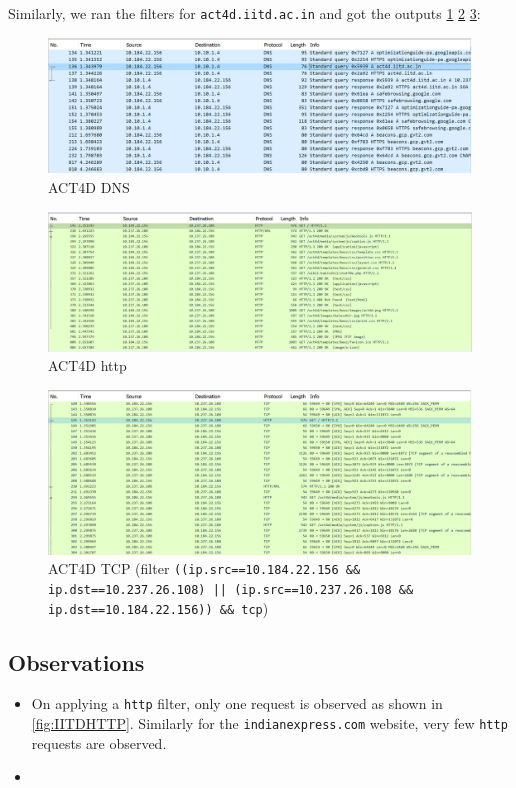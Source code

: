\documentclass{article}
\begin{document}
Similarly, we ran the filters for {\tt act4d.iitd.ac.in} and got the outputs \cref{fig:ACT4DDNS} \cref{fig:ACT4DHTTP} \cref{fig:ACT4DTCP}:
\begin{figure}[!ht]
    \centering
    \includegraphics[scale=0.5]{images/act4d dns.png}
    \caption{ACT4D DNS}
    \label{fig:ACT4DDNS}
\end{figure}

\begin{figure}[!ht]
    \centering
    \includegraphics[scale=0.5]{images/act4d http.png}
    \caption{ACT4D http}
    \label{fig:ACT4DHTTP}
\end{figure}

\begin{figure}[!ht]
    \centering
    \includegraphics[scale=0.5]{images/act4d tcp.png}
    \caption{ACT4D TCP (filter {\tt ((ip.src==10.184.22.156 \&\& ip.dst==10.237.26.108) || 
    (ip.src==10.237.26.108 \&\& ip.dst==10.184.22.156)) \&\& tcp})}
    \label{fig:ACT4DTCP}
\end{figure}

\subsection*{Observations}
\begin{itemize}
    \item On applying a {\tt http} filter, only one request is observed as shown in \cref{fig:IITDHTTP}. Similarly for the {\tt indianexpress.com} website, very few {\tt http} requests are observed.
    \item 
\end{itemize}

\clearpage

\end{document}
